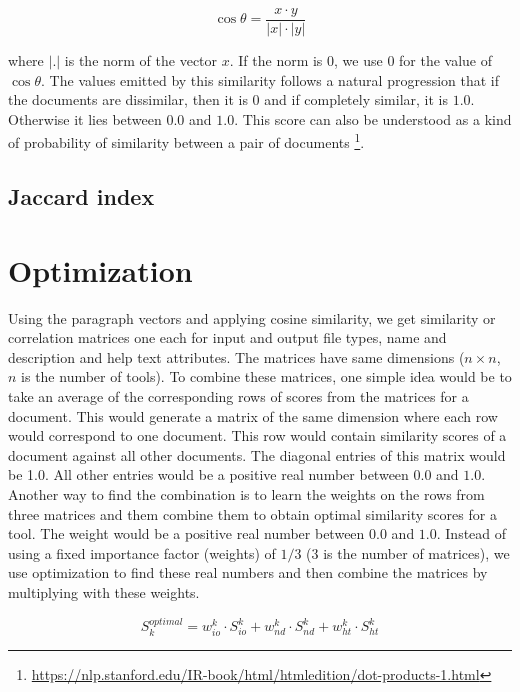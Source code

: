\begin{equation}
\cos{\theta} = \frac {x \cdot y}{|x| \cdot |y|} 
\end{equation}

where $|.|$ is the norm of the vector $x$. If the norm is $0$, we use $0$ for the value of $\cos{\theta}$. The values emitted by this similarity follows a natural progression that if the documents are dissimilar, then it is $0$ and if completely similar, it is $1.0$. Otherwise it lies between $0.0$ and $1.0$. This score can also be understood as a kind of probability of similarity between a pair of documents \footnote{\url{https://nlp.stanford.edu/IR-book/html/htmledition/dot-products-1.html}}. 

\subsection{Jaccard index}

\section{Optimization}
Using the paragraph vectors and applying cosine similarity, we get similarity or correlation matrices one each for input and output file types, name and description and help text attributes. The matrices have same dimensions ($n \times n$, $n$ is the number of tools). To combine these matrices, one simple idea would be to take an average of the corresponding rows of scores from the matrices for a document. This would generate a matrix of the same dimension where each row would correspond to one document. This row would contain similarity scores of a document against all other documents. The diagonal entries of this matrix would be 1.0. All other entries would be a positive real number between $0.0$ and $1.0$. Another way to find the combination is to learn the weights on the rows from three matrices and them combine them to obtain optimal similarity scores for a tool. The weight would be a positive real number between $0.0$ and $1.0$. Instead of using a fixed importance factor (weights) of $1 / 3$ ($3$ is the number of matrices), we use optimization to find these real numbers and then combine the matrices by multiplying with these weights.

\begin{equation}
S_k^{optimal} = w^k_{io} \cdot S^k_{io} +  w^k_{nd} \cdot S^k_{nd} + w^k_{ht} \cdot S^k_{ht}
\end{equation}

